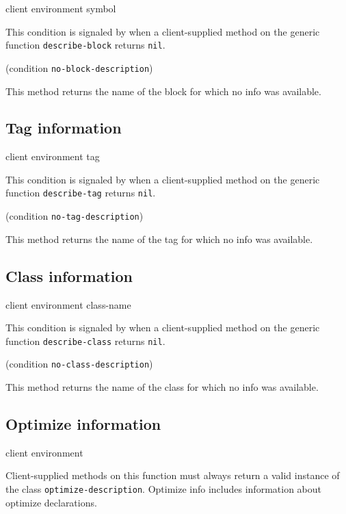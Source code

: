  {client environment symbol}


This condition is signaled by \sysname{} when a client-supplied method
on the generic function \texttt{describe-block} returns \texttt{nil}.

 {(condition {\tt no-block-description})}

This method returns the name of the block for which no info was
available.

\subsection{Tag information}

 {client environment tag}


This condition is signaled by \sysname{} when a client-supplied method
on the generic function \texttt{describe-tag} returns \texttt{nil}.

 {(condition {\tt no-tag-description})}

This method returns the name of the tag for which no info was
available.

\subsection{Class information}

 {client environment class-name}


This condition is signaled by \sysname{} when a client-supplied method
on the generic function \texttt{describe-class} returns \texttt{nil}.

 {(condition {\tt no-class-description})}

This method returns the name of the class for which no info was
available.

\subsection{Optimize information}

 {client environment}

Client-supplied methods on this function must always return a valid
instance of the class \texttt{optimize-description}. Optimize info includes
information about optimize declarations.


